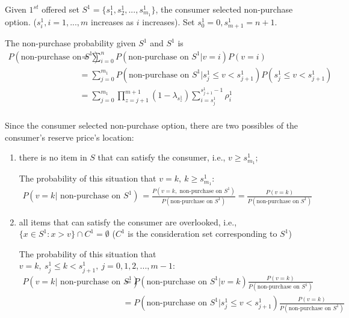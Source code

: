 Given $1^{st}$ offered set $S^1=\{s_1^1,s_2^1,...,s_{m_1}^1\}$, the consumer selected non-purchase option. ($s_i^1,i=1,...,m$ increases as $i$ increases). Set $s_0^1=0,s_{m+1}^1=n+1$.

The non-purchase probability given $S^1$ and $S^1$ is
\begin{equation}
    \begin{aligned}
        P(\text{non-purchase on }S^1)&=\sum_{i=0}^nP(\text{non-purchase on }S^1\vert v=i)P(v=i)\\
        &=\sum_{j=0}^{m_1} P(\text{non-purchase on }S^1\vert s_{j}^1\leq v< s_{j+1}^1)P(s_{j}^1\leq v< s_{j+1}^1)\\
        &=\sum_{j=0}^{m_1} \prod_{z=j+1}^{m+1}(1-\lambda_{s_{z}^1})\sum_{i=s_j^1}^{s_{j+1}^1-1}\rho_i^1\\
    \end{aligned}
    \nonumber
\end{equation}

Since the consumer selected non-purchase option, there are two possibles of the consumer's reserve price's location:
\begin{enumerate}[(1)]
    \item there is no item in $S$ that can satisfy the consumer, i.e., $v\geq s_{m_1}^1$;
    
    The probability of this situation that $v=k,\ k\geq s_{m_1}^1$:
    \begin{equation}
        \begin{aligned}
            P(v=k \vert\text{ non-purchase on }S^1)&=\frac{P(v=k,\text{ non-purchase on }S^1)}{P(\text{non-purchase on }S^1)}=\frac{P(v=k)}{P(\text{non-purchase on }S^1)}
        \end{aligned}
        \nonumber
    \end{equation}
    \item all items that can satisfy the consumer are overlooked, i.e., $\{x\in S^1:x>v\}\cap C^1=\emptyset$ ($C^1$ is the consideration set corresponding to $S^1$)
    
    The probability of this situation that $v=k,\ s_{j}^1\leq k< s_{j+1}^1,\ j=0,1,2,...,m-1$:
    \begin{equation}
        \begin{aligned}
            P(v=k \vert\text{ non-purchase on }S^1)&=P(\text{non-purchase on }S^1\vert v=k)\frac{P(v=k)}{P(\text{non-purchase on }S^1)}\\
            &=P(\text{non-purchase on }S^1\vert s_{j}^1\leq v< s_{j+1}^1)\frac{P(v=k)}{P(\text{non-purchase on }S^1)}\\
        \end{aligned}
        \nonumber
    \end{equation}
\end{enumerate}

